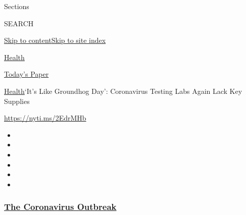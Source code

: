 Sections

SEARCH

\protect\hyperlink{site-content}{Skip to
content}\protect\hyperlink{site-index}{Skip to site index}

\href{https://www.nytimes3xbfgragh.onion/section/health}{Health}

\href{https://myaccount.nytimes3xbfgragh.onion/auth/login?response_type=cookie\&client_id=vi}{}

\href{https://www.nytimes3xbfgragh.onion/section/todayspaper}{Today's
Paper}

\href{/section/health}{Health}\textbar{}`It's Like Groundhog Day':
Coronavirus Testing Labs Again Lack Key Supplies

\url{https://nyti.ms/2EdrMHb}

\begin{itemize}
\item
\item
\item
\item
\item
\item
\end{itemize}

\hypertarget{the-coronavirus-outbreak}{%
\subsubsection{\texorpdfstring{\href{https://www.nytimes3xbfgragh.onion/news-event/coronavirus?name=styln-coronavirus-national\&region=TOP_BANNER\&block=storyline_menu_recirc\&action=click\&pgtype=Article\&impression_id=58f187a0-f4c5-11ea-9f76-ef806bade584\&variant=undefined}{The
Coronavirus
Outbreak}}{The Coronavirus Outbreak}}\label{the-coronavirus-outbreak}}

